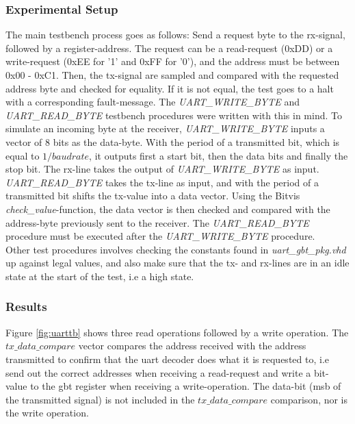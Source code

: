 \documentclass[main.tex]{subfiles}
\begin{document}
\subsubsection{Experimental Setup}
The main testbench process goes as follows: Send a request byte to the rx-signal, followed by a register-address. The request can be a read-request (0xDD) or a write-request (0xEE for '1' and 0xFF for '0'), and the address must be between 0x00 - 0xC1. Then, the tx-signal are sampled and compared with the requested address byte and checked for equality. If it is not equal, the test goes to a halt with a corresponding fault-message. The \textit{UART\_WRITE\_BYTE} and \textit{UART\_READ\_BYTE} testbench procedures were written with this in mind. To simulate an incoming byte at the receiver, \textit{UART\_WRITE\_BYTE} inputs a vector of 8 bits as the data-byte. With the period of a transmitted bit, which is equal to $1/baud rate$, it outputs first a start bit, then the data bits and finally the stop bit. The rx-line takes the output of \textit{UART\_WRITE\_BYTE} as input. \textit{UART\_READ\_BYTE} takes the tx-line as input, and with the period of a transmitted bit shifts the tx-value into a data vector. Using the Bitvis \textit{check\_value}-function, the data vector is then checked and compared with the address-byte previously sent to the receiver. The \textit{UART\_READ\_BYTE} procedure must be executed after the \textit{UART\_WRITE\_BYTE} procedure. \\

Other test procedures involves checking the constants found in \textit{uart\_gbt\_pkg.vhd} up against legal values, and also make sure that the tx- and rx-lines are in an idle state at the start of the test, i.e a high state.

\subsubsection{Results}

Figure \ref{fig:uarttb} shows three read operations followed by a write operation. The $tx\_data\_compare$ vector compares the address received with the address transmitted to confirm that the \gls{uart} decoder does what it is requested to, i.e send out the correct addresses when receiving a read-request and write a bit-value to the \gls{gbt} register when receiving a write-operation. The data-bit (\gls{msb} of the transmitted signal) is not included in the $tx\_data\_compare$ comparison, nor is the write operation. 
\end{document}
